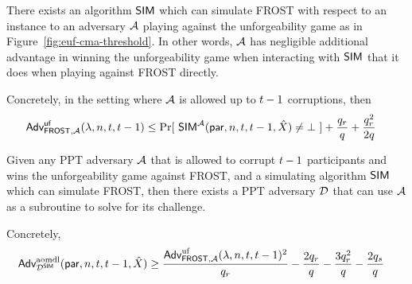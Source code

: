 \begin{lemma} \label{lem:frost-simulation}
There exists an algorithm $\mathsf{SIM}$ which can simulate FROST with respect to an \AOMDL instance to an adversary $\mathcal{A}$
playing against the unforgeability game as in Figure~\ref{fig:euf-cma-threshold}.
In other words,
$\mathcal{A}$ has negligible additional advantage in winning the unforgeability game when
interacting with $\mathsf{SIM}$ that it does when playing against FROST directly.

Concretely, in the setting where $\mathcal{A}$ is allowed up to $t-1$ corruptions, then
\begin{align} \label{eq:simulation-frost}
  \begin{split}
\textsf{\upshape Adv}^{\textrm{\upshape $\mathsf{uf}$}}_{\mathsf{FROST},\mathcal{A}}(\lambda, n, t, t-1)  & \leq
        \Pr [\ \mathsf{SIM}^{\mathcal{A}}(\mathsf{par}, n, t, t-1, \hat{X}) \neq \bot \ ]
        + \frac{q_r}{q}
        + \frac{q_r^2}{2q}
  \end{split}
\end{align}
\end{lemma}

\begin{lemma} \label{lem:frost-reduction}
Given any PPT adversary $\mathcal{A}$ that is allowed to corrupt $t-1$ participants and wins the unforgeability game against FROST,
and a simulating algorithm $\mathsf{SIM}$ which can simulate FROST,
then there exists a PPT \AOMDL adversary $\mathcal{D}$ that can use $\mathcal{A}$ as a subroutine to solve for its \AOMDL challenge.

Concretely,
    \begin{align} \label{eq:ddv-dl}
    \begin{split}
      \textsf{\upshape Adv}^{\textrm{\upshape aomdl}}_{\mathcal{D}^{\mathsf{SIM}}}(\mathsf{par}, n, t, t-1, \hat{X}) & \geq
        \frac{\textsf{\upshape Adv}^{\textrm{\upshape uf}}_{\mathsf{FROST},\mathcal{A}}(\lambda, n, t, t-1)^2}{q_r}
        - \frac{2q_r}{q}
        - \frac{3q_r^2}{q}
        - \frac{2q_s}{q}
    \end{split}
    \end{align}
\end{lemma}

